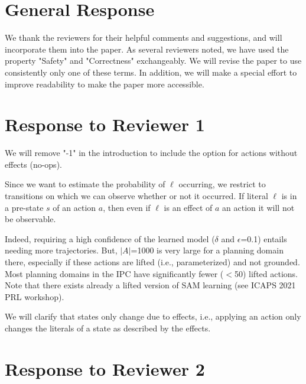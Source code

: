 \documentclass[letterpaper]{article} %
\begin{document}
\section{General Response}
We thank the reviewers for their helpful comments and suggestions, and will incorporate them into the paper. 
As several reviewers noted, we have used the property "Safety" and "Correctness" exchangeably. We will revise the paper to use consistently only one of these terms. 
In addition, we will make a special effort to improve readability to make the paper more accessible. 

\section{Response to Reviewer 1}

\begin{compactenum}

\item We will remove "-1" in the introduction to include the option for actions without effects (no-ops). 

\item Since we want to estimate the probability of $\ell$ occurring, we restrict to transitions on which we can observe whether or not it occurred. 
If literal $\ell$ is in a pre-state $s$ of an action $a$, then even if $\ell$ is an effect of $a$ an action it will not be observable. 

\item Indeed, requiring a high confidence of the learned model ($\delta$ and $\epsilon$=0.1) entails needing more trajectories. But, $|A|$=1000 is very large for a planning domain there, especially if these actions are lifted (i.e., parameterized) and not grounded. 
Most planning domains in the IPC have significantly fewer ($<$50) lifted actions. 
Note that there exists already a lifted version of SAM learning (see ICAPS 2021 PRL workshop). 

\item We will clarify that states only change due to effects, i.e., applying an action only changes the literals of a state as described by the effects. 

\end{compactenum}


\section{Response to Reviewer 2}
\end{document}
